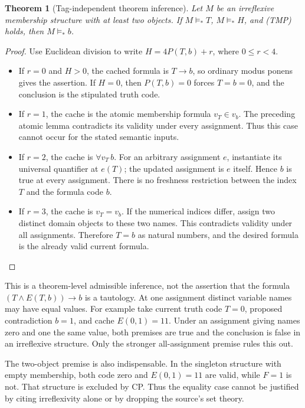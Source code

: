 \documentclass[11pt]{article}
\newtheorem{theorem}{Theorem}
\begin{document}
\begin{theorem}[Tag-independent theorem inference]
Let \(M\) be an irreflexive membership structure with at least two objects.
If \(M\models_* T\), \(M\models_* H\), and (TMP) holds, then
\(M\models_* b\).
\end{theorem}
\begin{proof}
Use Euclidean division to write \(H=4P(T,b)+r\), where \(0\le r<4\).
\begin{itemize}
\item If \(r=0\) and \(H>0\), the cached formula is \(T\to b\), so ordinary
modus ponens gives the assertion. If \(H=0\), then \(P(T,b)=0\) forces
\(T=b=0\), and the conclusion is the stipulated truth code.
\item If \(r=1\), the cache is the atomic membership formula
\(v_T\in v_b\). The preceding atomic lemma contradicts its validity under
every assignment. Thus this case cannot occur for the stated semantic inputs.
\item If \(r=2\), the cache is \(\forall v_T\,b\). For an arbitrary
assignment \(e\), instantiate its universal quantifier at \(e(T)\); the
updated assignment is \(e\) itself. Hence \(b\) is true at every assignment.
There is no freshness restriction between the index \(T\) and the formula
code \(b\).
\item If \(r=3\), the cache is \(v_T=v_b\). If the numerical indices differ,
assign two distinct domain objects to these two names. This contradicts
validity under all assignments. Therefore \(T=b\) as natural numbers, and
the desired formula is the already valid current formula.
\end{itemize}
\end{proof}

This is a theorem-level admissible inference, not the assertion that the
formula \((T\land E(T,b))\to b\) is a tautology. At one assignment distinct
variable names may have equal values. For example take current truth code
\(T=0\), proposed contradiction \(b=1\), and cache \(E(0,1)=11\). Under an
assignment giving names zero and one the same value, both premises are true
and the conclusion is false in an irreflexive structure. Only the stronger
all-assignment premise rules this out.

The two-object premise is also indispensable. In the singleton structure with
empty membership, both code zero and \(E(0,1)=11\) are valid, while \(F=1\)
is not. That structure is excluded by CP. Thus the equality case cannot be
justified by citing irreflexivity alone or by dropping the source's set theory.
\end{document}
